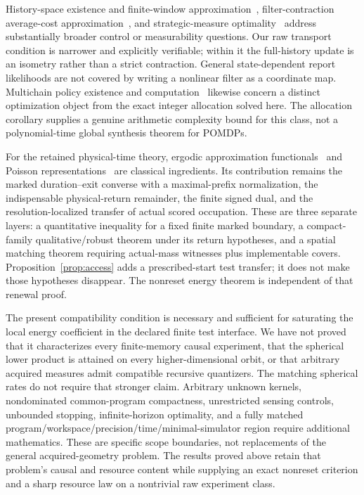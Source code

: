 History-space existence and finite-window approximation~\cite{YukselHistory}, filter-contraction average-cost approximation~\cite{DemirciKaraYuksel}, and strategic-measure optimality~\cite{YuStrategic} address substantially broader control or measurability questions. Our raw transport condition is narrower and explicitly verifiable; within it the full-history update is an isometry rather than a strict contraction. General state-dependent report likelihoods are not covered by writing a nonlinear filter as a coordinate map. Multichain policy existence and computation~\cite{Leizarowitz} likewise concern a distinct optimization object from the exact integer allocation solved here. The allocation corollary supplies a genuine arithmetic complexity bound for this class, not a polynomial-time global synthesis theorem for POMDPs.

For the retained physical-time theory, ergodic approximation functionals~\cite{Shaw} and Poisson representations~\cite{GlynnInfanger} are classical ingredients. Its contribution remains the marked duration--exit converse with a maximal-prefix normalization, the indispensable physical-return remainder, the finite signed dual, and the resolution-localized transfer of actual scored occupation. These are three separate layers: a quantitative inequality for a fixed finite marked boundary, a compact-family qualitative/robust theorem under its return hypotheses, and a spatial matching theorem requiring actual-mass witnesses plus implementable covers. Proposition~\ref{prop:access} adds a prescribed-start test transfer; it does not make those hypotheses disappear. The nonreset energy theorem is independent of that renewal proof.

The present compatibility condition is necessary and sufficient for saturating the local energy coefficient in the declared finite test interface. We have not proved that it characterizes every finite-memory causal experiment, that the spherical lower product is attained on every higher-dimensional orbit, or that arbitrary acquired measures admit compatible recursive quantizers. The matching spherical rates do not require that stronger claim. Arbitrary unknown kernels, nondominated common-program compactness, unrestricted sensing controls, unbounded stopping, infinite-horizon optimality, and a fully matched program/workspace/precision/time/minimal-simulator region require additional mathematics. These are specific scope boundaries, not replacements of the general acquired-geometry problem. The results proved above retain that problem's causal and resource content while supplying an exact nonreset criterion and a sharp resource law on a nontrivial raw experiment class.
